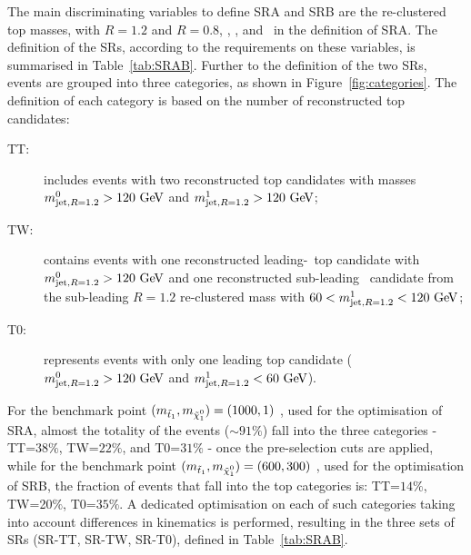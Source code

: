 				The main discriminating variables to define SRA and SRB are the re-clustered top masses, with $R = 1.2$ and $R = 0.8$, \mtbmin, \drbb, and \met\ in the definition of SRA. The definition of the \acp{SR}, according to the requirements on these variables, is summarised in Table~\ref{tab:SRAB}. Further to the definition of the two \acp{SR}, events are grouped into three categories, as shown in Figure~\ref{fig:categories}. The definition of each category is based on the number of reconstructed top candidates: 
				
				\begin{description}
					\item[TT:] includes events with two reconstructed top candidates with masses $\mantikttwelvezero>120\gev$ and $\mantikttwelveone>120\gev$;
					\item[TW:] contains events with one reconstructed leading-\pt\ top candidate with $\mantikttwelvezero>120\gev$ and one reconstructed sub-leading \Wboson\ candidate from the sub-leading $R = 1.2$ re-clustered mass with $60<\mantikttwelveone<120\gev$;
					\item[T0:] represents events with only one leading top candidate ($\mantikttwelvezero>120\gev$ and $\mantikttwelveone<60\gev$).
				\end{description}

				\noindent For the benchmark point $(\mstopone, \mninoone) = (1000,1)$ \GeV, used for the optimisation of SRA, almost the totality of the events ($\sim 91\%$) fall into the three categories - TT=$38\%$, TW=$22\%$, and T0=$31\%$ - once the pre-selection cuts are applied, while for the benchmark point $(\mstopone, \mninoone) = (600,300)$ \GeV, used for the optimisation of SRB, the fraction of events that fall into the top categories is: TT=$14\%$, TW=20$\%$, T0=$35\%$. A dedicated optimisation on each of such categories taking into account differences in kinematics is performed, resulting in the three sets of \acp{SR} (SR-TT, SR-TW, SR-T0), defined in Table~\ref{tab:SRAB}. %
				
